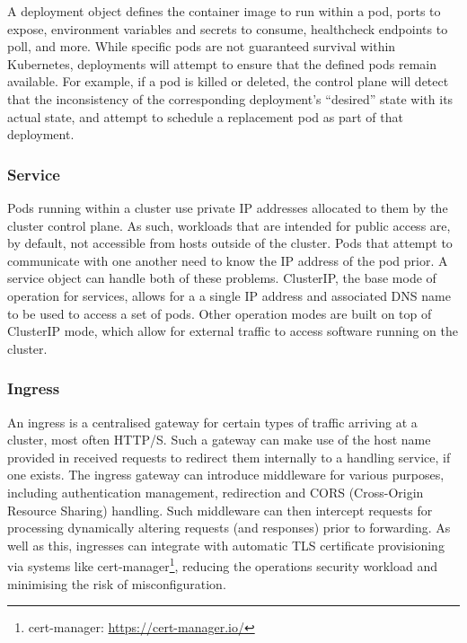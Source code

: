 A deployment object defines the container image to run within a pod, ports to expose, environment variables and secrets to consume, healthcheck endpoints to poll, and more. While specific pods are not guaranteed survival within Kubernetes, deployments will attempt to ensure that the defined pods remain available. For example, if a pod is killed or deleted, the control plane will detect that the inconsistency of the corresponding deployment's ``desired'' state with its actual state, and attempt to schedule a replacement pod as part of that deployment.

\subsubsection{Service}

Pods running within a cluster use private IP addresses allocated to them by the cluster control plane. As such, workloads that are intended for public access are, by default, not accessible from hosts outside of the cluster. Pods that attempt to communicate with one another need to know the IP address of the pod prior. A service object can handle both of these problems. ClusterIP, the base mode of operation for services, allows for a a single IP address and associated DNS name to be used to access a set of pods. Other operation modes are built on top of ClusterIP mode, which allow for external traffic to access software running on the cluster.

\subsubsection{Ingress}

An ingress is a centralised gateway for certain types of traffic arriving at a cluster, most often HTTP/S. Such a gateway can make use of the host name provided in received requests to redirect them internally to a handling service, if one exists. The ingress gateway can introduce middleware for various purposes, including authentication management, redirection and CORS (Cross-Origin Resource Sharing) handling. Such middleware can then intercept requests for processing dynamically altering requests (and responses) prior to forwarding. As well as this, ingresses can integrate with automatic TLS certificate provisioning via systems like cert-manager\footnote{cert-manager: \url{https://cert-manager.io/}}, reducing the operations security workload and minimising the risk of misconfiguration.